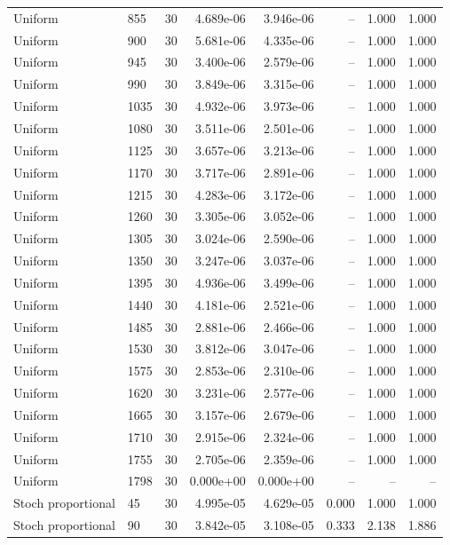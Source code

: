 \begin{scriptsize}
\begin{longtable}{llrrrrrr}
Uniform & 855 & 30 & 4.689e-06 & 3.946e-06 & -- & 1.000 & 1.000 \\
Uniform & 900 & 30 & 5.681e-06 & 4.335e-06 & -- & 1.000 & 1.000 \\
Uniform & 945 & 30 & 3.400e-06 & 2.579e-06 & -- & 1.000 & 1.000 \\
Uniform & 990 & 30 & 3.849e-06 & 3.315e-06 & -- & 1.000 & 1.000 \\
Uniform & 1035 & 30 & 4.932e-06 & 3.973e-06 & -- & 1.000 & 1.000 \\
Uniform & 1080 & 30 & 3.511e-06 & 2.501e-06 & -- & 1.000 & 1.000 \\
Uniform & 1125 & 30 & 3.657e-06 & 3.213e-06 & -- & 1.000 & 1.000 \\
Uniform & 1170 & 30 & 3.717e-06 & 2.891e-06 & -- & 1.000 & 1.000 \\
Uniform & 1215 & 30 & 4.283e-06 & 3.172e-06 & -- & 1.000 & 1.000 \\
Uniform & 1260 & 30 & 3.305e-06 & 3.052e-06 & -- & 1.000 & 1.000 \\
Uniform & 1305 & 30 & 3.024e-06 & 2.590e-06 & -- & 1.000 & 1.000 \\
Uniform & 1350 & 30 & 3.247e-06 & 3.037e-06 & -- & 1.000 & 1.000 \\
Uniform & 1395 & 30 & 4.936e-06 & 3.499e-06 & -- & 1.000 & 1.000 \\
Uniform & 1440 & 30 & 4.181e-06 & 2.521e-06 & -- & 1.000 & 1.000 \\
Uniform & 1485 & 30 & 2.881e-06 & 2.466e-06 & -- & 1.000 & 1.000 \\
Uniform & 1530 & 30 & 3.812e-06 & 3.047e-06 & -- & 1.000 & 1.000 \\
Uniform & 1575 & 30 & 2.853e-06 & 2.310e-06 & -- & 1.000 & 1.000 \\
Uniform & 1620 & 30 & 3.231e-06 & 2.577e-06 & -- & 1.000 & 1.000 \\
Uniform & 1665 & 30 & 3.157e-06 & 2.679e-06 & -- & 1.000 & 1.000 \\
Uniform & 1710 & 30 & 2.915e-06 & 2.324e-06 & -- & 1.000 & 1.000 \\
Uniform & 1755 & 30 & 2.705e-06 & 2.359e-06 & -- & 1.000 & 1.000 \\
Uniform & 1798 & 30 & 0.000e+00 & 0.000e+00 & -- & -- & -- \\
Stoch proportional & 45 & 30 & 4.995e-05 & 4.629e-05 & 0.000 & 1.000 & 1.000 \\
Stoch proportional & 90 & 30 & 3.842e-05 & 3.108e-05 & 0.333 & 2.138 & 1.886 \\

\end{longtable}
\end{scriptsize}
